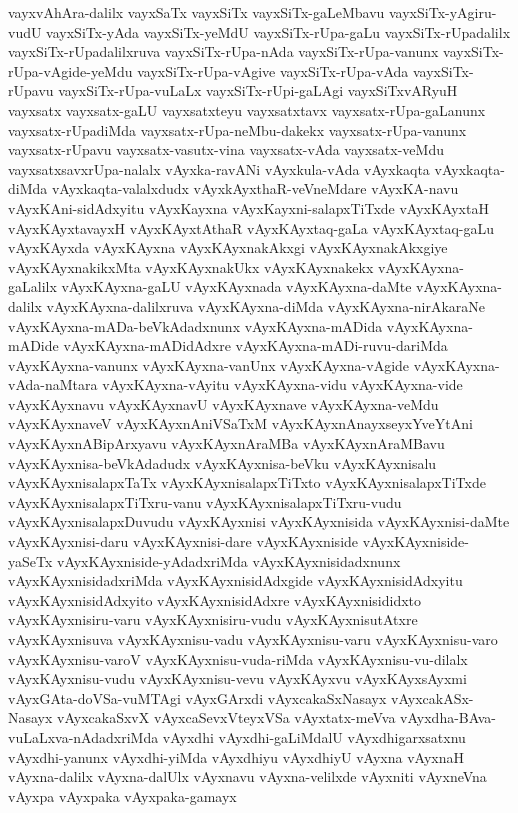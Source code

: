 {vayxvAhAra-dalilx
vayxSaTx
vayxSiTx
vayxSiTx-gaLeMbavu
vayxSiTx-yAgiru-vudU
vayxSiTx-yAda
vayxSiTx-yeMdU
vayxSiTx-rUpa-gaLu
vayxSiTx-rUpadalilx
vayxSiTx-rUpadalilxruva
vayxSiTx-rUpa-nAda
vayxSiTx-rUpa-vanunx
vayxSiTx-rUpa-vAgide-yeMdu
vayxSiTx-rUpa-vAgive
vayxSiTx-rUpa-vAda
vayxSiTx-rUpavu
vayxSiTx-rUpa-vuLaLx
vayxSiTx-rUpi-gaLAgi
vayxSiTxvARyuH
vayxsatx
vayxsatx-gaLU
vayxsatxteyu
vayxsatxtavx
vayxsatx-rUpa-gaLanunx
vayxsatx-rUpadiMda
vayxsatx-rUpa-neMbu-dakekx
vayxsatx-rUpa-vanunx
vayxsatx-rUpavu
vayxsatx-vasutx-vina
vayxsatx-vAda
vayxsatx-veMdu
vayxsatxsavxrUpa-nalalx
vAyxka-ravANi
vAyxkula-vAda
vAyxkaqta
vAyxkaqta-diMda
vAyxkaqta-valalxdudx
vAyxkAyxthaR-veVneMdare
vAyxKA-navu
vAyxKAni-sidAdxyitu
vAyxKayxna
vAyxKayxni-salapxTiTxde
vAyxKAyxtaH
vAyxKAyxtavayxH
vAyxKAyxtAthaR
vAyxKAyxtaq-gaLa
vAyxKAyxtaq-gaLu
vAyxKAyxda
vAyxKAyxna
vAyxKAyxnakAkxgi
vAyxKAyxnakAkxgiye
vAyxKAyxnakikxMta
vAyxKAyxnakUkx
vAyxKAyxnakekx
vAyxKAyxna-gaLalilx
vAyxKAyxna-gaLU
vAyxKAyxnada
vAyxKAyxna-daMte
vAyxKAyxna-dalilx
vAyxKAyxna-dalilxruva
vAyxKAyxna-diMda
vAyxKAyxna-nirAkaraNe
vAyxKAyxna-mADa-beVkAdadxnunx
vAyxKAyxna-mADida
vAyxKAyxna-mADide
vAyxKAyxna-mADidAdxre
vAyxKAyxna-mADi-ruvu-dariMda
vAyxKAyxna-vanunx
vAyxKAyxna-vanUnx
vAyxKAyxna-vAgide
vAyxKAyxna-vAda-naMtara
vAyxKAyxna-vAyitu
vAyxKAyxna-vidu
vAyxKAyxna-vide
vAyxKAyxnavu
vAyxKAyxnavU
vAyxKAyxnave
vAyxKAyxna-veMdu
vAyxKAyxnaveV
vAyxKAyxnAniVSaTxM
vAyxKAyxnAnayxseyxYveYtAni
vAyxKAyxnABipArxyavu
vAyxKAyxnAraMBa
vAyxKAyxnAraMBavu
vAyxKAyxnisa-beVkAdadudx
vAyxKAyxnisa-beVku
vAyxKAyxnisalu
vAyxKAyxnisalapxTaTx
vAyxKAyxnisalapxTiTxto
vAyxKAyxnisalapxTiTxde
vAyxKAyxnisalapxTiTxru-vanu
vAyxKAyxnisalapxTiTxru-vudu
vAyxKAyxnisalapxDuvudu
vAyxKAyxnisi
vAyxKAyxnisida
vAyxKAyxnisi-daMte
vAyxKAyxnisi-daru
vAyxKAyxnisi-dare
vAyxKAyxniside
vAyxKAyxniside-yaSeTx
vAyxKAyxniside-yAdadxriMda
vAyxKAyxnisidadxnunx
vAyxKAyxnisidadxriMda
vAyxKAyxnisidAdxgide
vAyxKAyxnisidAdxyitu
vAyxKAyxnisidAdxyito
vAyxKAyxnisidAdxre
vAyxKAyxnisididxto
vAyxKAyxnisiru-varu
vAyxKAyxnisiru-vudu
vAyxKAyxnisutAtxre
vAyxKAyxnisuva
vAyxKAyxnisu-vadu
vAyxKAyxnisu-varu
vAyxKAyxnisu-varo
vAyxKAyxnisu-varoV
vAyxKAyxnisu-vuda-riMda
vAyxKAyxnisu-vu-dilalx
vAyxKAyxnisu-vudu
vAyxKAyxnisu-vevu
vAyxKAyxvu
vAyxKAyxsAyxmi
vAyxGAta-doVSa-vuMTAgi
vAyxGArxdi
vAyxcakaSxNasayx
vAyxcakASx-Nasayx
vAyxcakaSxvX
vAyxcaSevxVteyxVSa
vAyxtatx-meVva
vAyxdha-BAva-vuLaLxva-nAdadxriMda
vAyxdhi
vAyxdhi-gaLiMdalU
vAyxdhigarxsatxnu
vAyxdhi-yanunx
vAyxdhi-yiMda
vAyxdhiyu
vAyxdhiyU
vAyxna
vAyxnaH
vAyxna-dalilx
vAyxna-dalUlx
vAyxnavu
vAyxna-velilxde
vAyxniti
vAyxneVna
vAyxpa
vAyxpaka
vAyxpaka-gamayx
}
